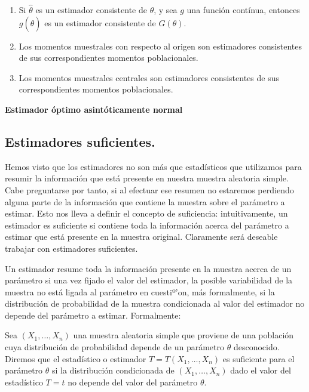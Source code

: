 \begin{enumerate}
\item Si $\hat{\theta}$ es un estimador consistente de $\theta$, y sea $g$ una funci\'on cont\'inua, entonces $g(\hat{\theta})$ es un estimador consistente de $G(\theta)$.
\item Los momentos muestrales con respecto al origen son estimadores consistentes de sus correspondientes momentos poblacionales.
\item Los momentos muestrales centrales son estimadores consistentes de sus correspondientes momentos poblacionales.
\end{enumerate}

\textbf{Estimador \'optimo asint\'oticamente normal}



\subsection{Estimadores suficientes.}

Hemos visto que los estimadores no son m\'as que estad\'isticos que utilizamos para resumir la informaci\'on que est\'a presente en nuestra muestra aleatoria simple. Cabe preguntarse por tanto, si al efectuar ese resumen no estaremos perdiendo alguna parte de la informaci\'on que contiene la muestra sobre el par\'ametro a estimar. Esto nos lleva a definir el concepto de suficiencia: intuitivamente, un estimador es suficiente si contiene toda la informaci\'on acerca del par\'ametro a estimar que est\'a presente en la muestra original. Claramente ser\'a deseable trabajar con estimadores suficientes.

Un estimador resume toda la informaci\'on presente en la muestra acerca de un par\'ametro si una vez fijado el valor del estimador, la posible variabilidad de la muestra no est\'a ligada al par\'ametro en cuestiº'on, m\'as formalmente, si la distribuci\'on de probabilidad de la muestra condicionada al valor del estimador no depende del par\'ametro a estimar. Formalmente:
\begin{definicion}
Sea $(X_1,\ldots,X_n)$ una muestra aleatoria simple que proviene de una poblaci\'on cuya distribuci\'on de probabilidad depende de un par\'ametro $\theta$ desconocido. Diremos que el estad\'istico o estimador $T=T(X_1,\ldots,X_n)$ es suficiente para el par\'ametro $\theta$ si la distribuci\'on condicionada de $(X_1,\ldots,X_n)$ dado el valor del estad\'istico $T=t$ no depende del valor del par\'ametro $\theta$.
\end{definicion}


